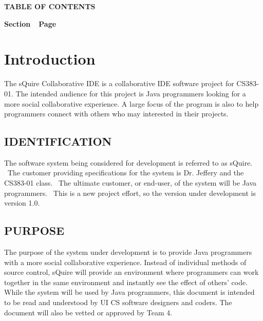 \documentclass[twoside,letterpaper]{article}
\begin{document}

{\centering{}\bfseries\color{black}
TABLE OF CONTENTS
\par}


\bigskip

{\bfseries\color{black}
Section\ \ Page}

\setcounter{tocdepth}{9}
\renewcommand\contentsname{}
\tableofcontents

\bigskip

\clearpage\clearpage\setcounter{page}{1}\pagestyle{Convertii}
\section[Introduction]{\rmfamily\bfseries Introduction}
\hypertarget{RefHeading15659017292}{}{
{
The sQuire Collaborative IDE is a collaborative IDE software project for CS383-01. The intended audience for this project is Java programmers looking for a more social collaborative experience. A large focus of the program is also to help programmers connect with others who may interested in their projects.}}

\subsection[IDENTIFICATION]{\rmfamily\bfseries IDENTIFICATION}
\hypertarget{RefHeading15859017292}{}
{
The software system being considered for development is referred to as sQuire. \ The customer
providing specifications for the system is Dr. Jeffery and the CS383-01 class. \ The ultimate customer, or end-user, of
the system will be Java programmers. \ This is a new project effort, so the
version under development is version 1.0.}

\subsection[PURPOSE]{\rmfamily\bfseries PURPOSE}
\hypertarget{RefHeading16059017292}{}

{
The purpose of the system under development is to
provide Java programmers with a more social collaborative experience. Instead of individual methods of source control, sQuire will provide an environment where programmers can work together in the same environment and instantly see the effect of others' code. While the system will be used by Java programmers, this document is intended to be read and understood
by UI CS software designers and coders.
The document will also be vetted or approved by Team 4.}
\end{document}
